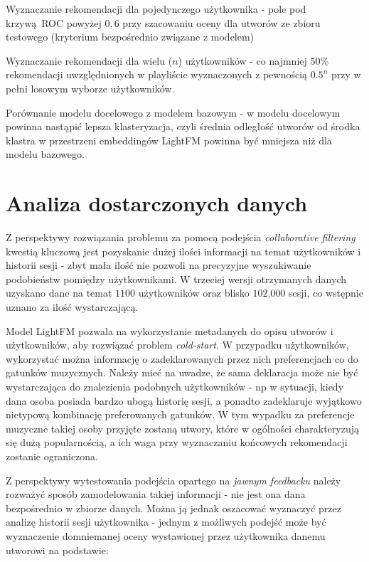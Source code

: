 \documentclass[10pt,a4paper]{article}
\begin{document}
Wyznaczanie rekomendacji dla pojedynczego użytkownika - pole pod krzywą ROC powyżej $0,6$ przy szacowaniu oceny dla utworów ze zbioru testowego (kryterium bezpośrednio związane z modelem)

Wyznaczanie rekomendacji dla wielu ($n$) użytkowników - co najmniej $50\%$ rekomendacji uwzględnionych w playliście wyznaczonych z pewnością $0.5^n$ przy w pełni losowym wyborze użytkowników.

Porównanie modelu docelowego z modelem bazowym - w modelu docelowym powinna nastąpić lepsza klasteryzacja, czyli średnia odległość utworów od środka klastra w przestrzeni embeddingów LightFM powinna być mniejsza niż dla modelu bazowego.

\section{Analiza dostarczonych danych}


Z perspektywy rozwiązania problemu za pomocą podejścia \textit{collaborative filtering} kwestią kluczową jest pozyskanie dużej ilości informacji na temat użytkowników i historii sesji - zbyt mała ilość nie pozwoli na precyzyjne wyszukiwanie podobieństw pomiędzy użytkownikami. W trzeciej wersji otrzymanych danych uzyskano dane na temat $1100$ użytkowników oraz blisko $102.000$ sesji, co wstępnie uznano za ilość wystarczającą.


Model LightFM pozwala na wykorzystanie metadanych do opisu utworów i użytkowników, aby rozwiązać problem \textit{cold-start}. W przypadku użytkowników, wykorzystać można informację o zadeklarowanych przez nich preferencjach co do gatunków muzycznych. Należy mieć na uwadze, że sama deklaracja może nie być wystarczająca do znalezienia podobnych użytkowników - np w sytuacji, kiedy dana osoba posiada bardzo ubogą historię sesji, a ponadto zadeklaruje wyjątkowo nietypową kombinację preferowanych gatunków. W tym wypadku za preferencje muzyczne takiej osoby przyjęte zostaną utwory, które w ogólności charakteryzują się dużą popularnością, a ich waga przy wyznaczaniu końcowych rekomendacji zostanie ograniczona. 

Z perspektywy wytestowania podejścia opartego na \textit{jawnym feedbacku} należy rozważyć sposób zamodelowania takiej informacji - nie jest ona dana bezpośrednio w zbiorze danych. Można ją jednak oszacować wyznaczyć przez analizę historii sesji użytkownika - jednym z możliwych podejść może być wyznaczenie domniemanej oceny wystawionej przez użytkownika danemu utworowi na podstawie:
\end{document}
